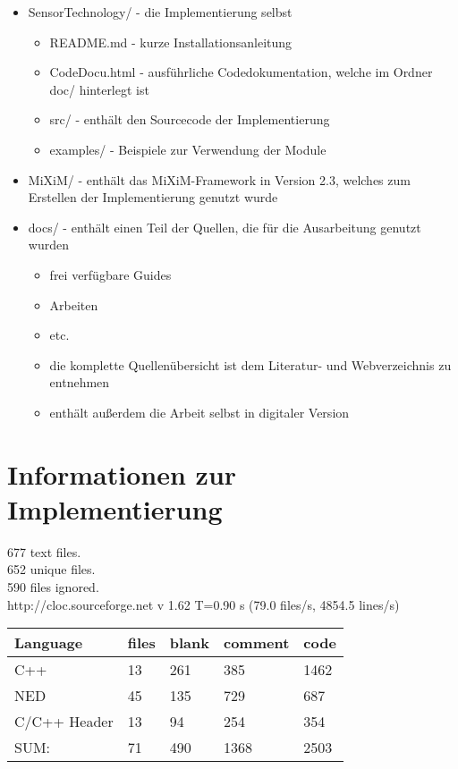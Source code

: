 \begin{itemize}
\item SensorTechnology/ - die Implementierung selbst
\begin{itemize}
\item README.md - kurze Installationsanleitung
\item CodeDocu.html - ausführliche Codedokumentation, welche im Ordner doc/ hinterlegt ist
\item src/ - enthält den Sourcecode der Implementierung
\item examples/ - Beispiele zur Verwendung der Module
\end{itemize} 
\item MiXiM/ - enthält das MiXiM-Framework in Version 2.3, welches zum Erstellen der Implementierung genutzt wurde
\item docs/ - enthält einen Teil der Quellen, die für die Ausarbeitung genutzt wurden 
\begin{itemize}
\item frei verfügbare Guides
\item Arbeiten
\item etc. 
\item die komplette Quellenübersicht ist dem Literatur- und Webverzeichnis zu entnehmen
\item enthält außerdem die Arbeit selbst in digitaler Version
\end{itemize}
\end{itemize}

\section*{Informationen zur Implementierung}

     677 text files.\\
     652 unique files.\\                                          
     590 files ignored.\\
     
http://cloc.sourceforge.net v 1.62  T=0.90 s (79.0 files/s, 4854.5 lines/s)\\


\begin{table}[!ht]
  \centering  
\begin{tabularx}{\textwidth}{lllll}
	\toprule
	Language & files & blank & comment & code\\
	\midrule
C++ & 13 & 261 & 385 & 1462\\
NED & 45 & 135 & 729 & 687\\
C/C++ Header & 13 & 94 & 254 & 354\\
	\midrule	
	SUM:  & 71 & 490 & 1368 & 2503\\
	\midrule
	\bottomrule
\end{tabularx}
\end{table}